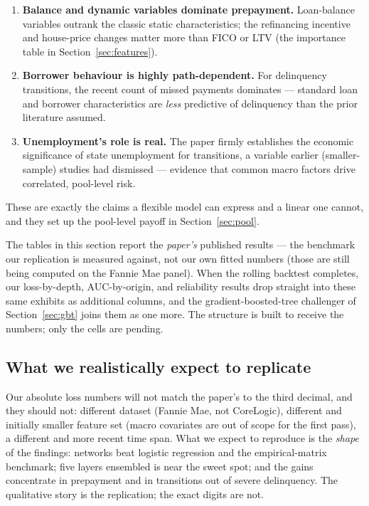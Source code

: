 \documentclass[11pt]{article}
\begin{document}
\begin{keyidea}
\begin{enumerate}[leftmargin=1.4em, itemsep=2pt]
  \item \textbf{Balance and dynamic variables dominate prepayment.} Loan-balance variables
        outrank the classic static characteristics; the refinancing incentive and house-price
        changes matter more than FICO or LTV (the importance table in
        Section~\ref{sec:features}).
  \item \textbf{Borrower behaviour is highly path-dependent.} For delinquency transitions, the
        recent count of missed payments dominates --- standard loan and borrower characteristics
        are \emph{less} predictive of delinquency than the prior literature assumed.
  \item \textbf{Unemployment's role is real.} The paper firmly establishes the economic
        significance of state unemployment for transitions, a variable earlier (smaller-sample)
        studies had dismissed --- evidence that common macro factors drive correlated,
        pool-level risk.
\end{enumerate}
These are exactly the claims a flexible model can express and a linear one cannot, and they set
up the pool-level payoff in Section~\ref{sec:pool}.
\end{keyidea}

\begin{intuition}
The tables in this section report the \emph{paper's} published results --- the benchmark our
replication is measured against, not our own fitted numbers (those are still being computed on
the Fannie Mae panel). When the rolling backtest completes, our loss-by-depth, AUC-by-origin,
and reliability results drop straight into these same exhibits as additional columns, and the
gradient-boosted-tree challenger of Section~\ref{sec:gbt} joins them as one more. The structure
is built to receive the numbers; only the cells are pending.
\end{intuition}

\subsection{What we realistically expect to replicate}

\begin{intuition}
Our absolute loss numbers will not match the paper's to the third decimal, and they
should not: different dataset (Fannie Mae, not CoreLogic), different and initially smaller
feature set (macro covariates are out of scope for the first pass), a different and more
recent time span. What we expect to reproduce is the \emph{shape} of the findings: networks
beat logistic regression and the empirical-matrix benchmark; five layers ensembled is near
the sweet spot; and the gains concentrate in prepayment and in transitions out of severe
delinquency. The qualitative story is the replication; the exact digits are not.
\end{intuition}
\end{document}
